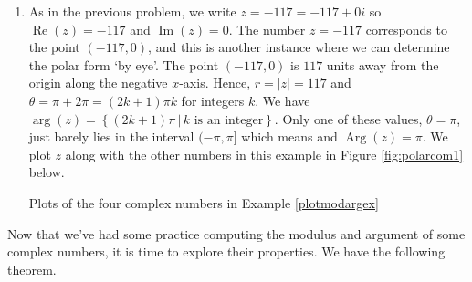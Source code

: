 {\begin{enumerate}
\item As in the previous problem, we write $z = -117 = -117 + 0i$ so $\operatorname{Re}(z) = -117$ and $\operatorname{Im}(z) = 0$. The number $z = -117$ corresponds to the point $(-117,0)$, and this is another instance where  we can determine the polar form `by eye'.  The point $(-117,0)$ is $117$ units away from the origin along the negative $x$-axis.  Hence, $r=|z|=117$ and $\theta = \pi + 2\pi  = (2k+1)\pi k$ for integers $k$. We have  $\operatorname{arg}(z) = \left\{ (2k+1)\pi \, | \, k \text{ is an  integer} \right\}$.  Only one of these values, $\theta = \pi$, just barely lies in the interval $(-\pi, \pi]$ which means and $\operatorname{Arg}(z) =\pi$. We plot $z$ along with the other numbers in this example in Figure \ref{fig:polarcom1} below.

\medskip

\noindent\begin{minipage}{\textwidth}
\begin{center}
\end{center}
\captionsetup{type=figure}
\caption{Plots of the four complex numbers in Example \ref{plotmodargex}}\label{fig:polarcom1}
\end{minipage}

\end{enumerate}
}

\medskip

Now that we've had some practice computing the modulus and argument of some complex numbers, it is time to explore their properties.  We have the following theorem.

\smallskip


